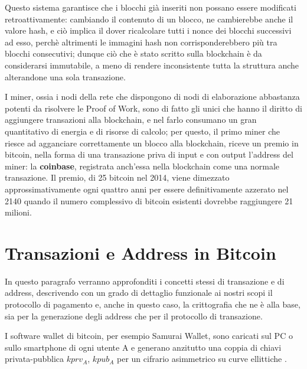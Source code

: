 Questo sistema garantisce che i blocchi già inseriti non possano essere modificati retroattivamente: cambiando il contenuto di un blocco, ne cambierebbe anche il valore hash, e ciò implica il dover ricalcolare tutti i nonce dei blocchi successivi ad esso, perchè altrimenti le immagini hash non corrisponderebbero più tra blocchi consecutivi; dunque ciò che è stato scritto sulla blockchain è da considerarsi immutabile, a meno di rendere inconsistente tutta la struttura anche alterandone una sola transazione.

I miner, ossia i nodi della rete che dispongono di nodi di elaborazione abbastanza potenti da risolvere le Proof of Work, sono di fatto gli unici che hanno il diritto di aggiungere transazioni alla blockchain, e nel farlo consumano un gran quantitativo di energia e di risorse di calcolo; per questo, il primo miner che riesce ad agganciare correttamente un blocco alla blockchain, riceve un premio in bitcoin, nella forma di una transazione priva di input e con output l’address del miner: la \textbf{coinbase}, registrata anch’essa nella blockchain come una normale transazione. Il premio, di 25 bitcoin nel 2014, viene dimezzato approssimativamente ogni quattro anni per essere deﬁnitivamente azzerato nel 2140 quando il numero complessivo di bitcoin esistenti dovrebbe raggiungere 21 milioni.
\section{Transazioni e Address in Bitcoin}\label{Transazioni}
In questo  paragrafo verranno approfonditi i concetti stessi di transazione e di address, descrivendo con un grado di dettaglio funzionale ai nostri scopi il protocollo di pagamento e, anche in questo caso, la crittografia che ne è alla base, sia per la generazione degli address che per il protocollo di transazione.

I software wallet di bitcoin, per esempio Samurai Wallet, sono caricati sul PC o sullo smartphone di ogni utente A e generano anzitutto una coppia di chiavi privata-pubblica $kprv_A$, $kpub_A$ per un cifrario asimmetrico su curve ellittiche \cite{curve}.

